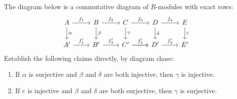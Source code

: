 \documentclass[12 pt, letterpaper]{hmcpset}
\begin{document}
\begin{problem}[2.]
	The diagram below is a commutative diagram of $R$-modules with exact rows:
	\[
		\begin{tikzcd}
			A \ar[r, "f_{1}"] \ar[d, "\alpha"] & B \ar[r, "f_{2}"] \ar[d, "\beta"] & C \ar[r, "f_{3}"] \ar[d, "\gamma"] & D \ar[r, "f_{4}"] \ar[d, "\delta"] & E \ar[d, "\varepsilon"] \\
			A' \ar[r, "f_{1}'"] & B' \ar[r, "f_{2}'"] & C' \ar[r, "f_{3}'"] \ar[r] & D' \ar[r, "f_{4}'"] & E'
		\end{tikzcd}
	\]
	Establish the following claims directly, by diagram chase:
	\begin{enumerate}
		\item If $\alpha$ is surjective and $\beta$ and $\delta$ are both injective, then $\gamma$ is injective.

		\item If $\varepsilon$ is injective and $\beta$ and $\delta$ are both surjective, then $\gamma$ is surjective.
	\end{enumerate}
\end{problem}
\end{document}
